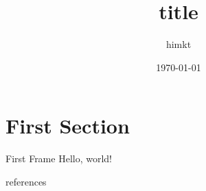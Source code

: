 \documentclass{beamer}
\title{title}
\date{\today}
\author{himkt}
\institute{everywhere}
\begin{document}
  \maketitle
  \section{First Section}
  \begin{frame}{First Frame}
    Hello, world!\cite{greenwade93}
  \end{frame}

  \begin{frame}{references}
    
    
  \end{frame}
\end{document}
